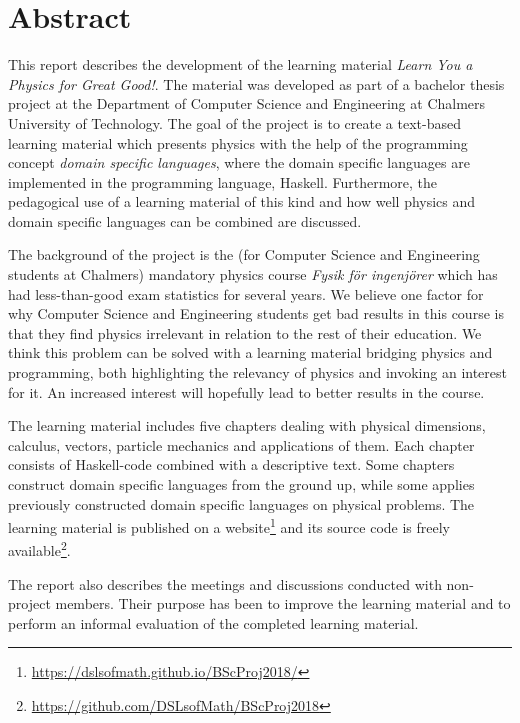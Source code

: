\setlength{\parskip}{0.5cm}

\thispagestyle{plain}			%
\section*{Abstract}

This report describes the development of the learning material \textit{Learn You
a Physics for Great Good!}. The material was developed as part of a bachelor
thesis project at the Department of Computer Science and Engineering at Chalmers
University of Technology. The goal of the project is to create a text-based
learning material which presents physics with the help of the programming
concept \textit{domain specific languages}, where the domain specific languages
are implemented in the programming language, Haskell. Furthermore, the
pedagogical use of a learning material of this kind and how well physics and
domain specific languages can be combined are discussed.

The background of the project is the (for Computer Science and Engineering
students at Chalmers) mandatory physics course \textit{Fysik för ingenjörer}
which has had less-than-good exam statistics for several years. We believe one
factor for why Computer Science and Engineering students get bad results in this
course is that they find physics irrelevant in relation to the rest of their
education. We think this problem can be solved with a learning material bridging
physics and programming, both highlighting the relevancy of physics and invoking
an interest for it. An increased interest will hopefully lead to better
results in the course.

The learning material includes five chapters dealing with physical dimensions,
calculus, vectors, particle mechanics and applications of them. Each chapter
consists of Haskell-code combined with a descriptive text. Some chapters
construct domain specific languages from the ground up, while some applies
previously constructed domain specific languages on physical problems. The
learning material is published on a
website\footnote{\url{https://dslsofmath.github.io/BScProj2018/}} and its source
code is freely
available\footnote{\url{https://github.com/DSLsofMath/BScProj2018}}.

The report also describes the meetings and discussions conducted with
non-project members. Their purpose has been to improve the learning material
and to perform an informal evaluation of the completed learning material.

